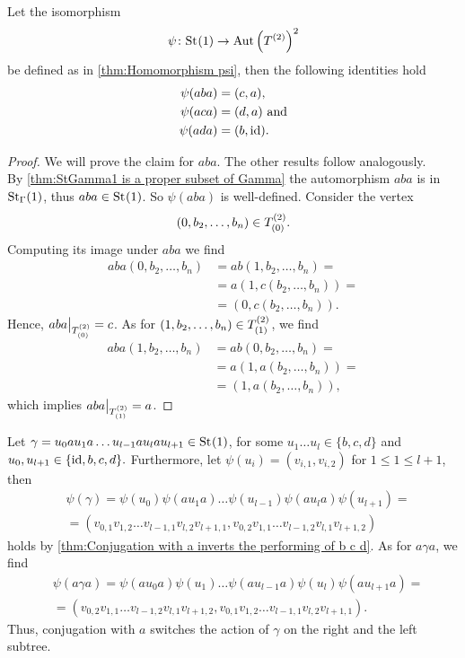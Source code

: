 \begin{thm}\label{thm:Conjugation with a inverts the performing of b c d}
Let the isomorphism
\begin{equation*}
\psi\colon\St{1}\to\AutT^2
\end{equation*}
be defined as in \cref{thm:Homomorphism psi}, then the following identities hold
\begin{align*}
\psi(aba)&=(c,a),\\
\psi(aca)&=(d,a) \text{ and}\\
\psi(ada)&=(b,\id).
\end{align*}
\end{thm}
\begin{proof}
We will prove the claim for $aba$. The other results follow analogously.\\
By \cref{thm:StGamma1 is a proper subset of Gamma} the automorphism $aba$ is in $\St[\Gamma]{1}$, thus $aba\in\St{1}$. So $\psi(aba)$ is well-defined. Consider the vertex
\begin{equation*}
(0,b_2,\ldots,b_n)\in\ST{(0)}.
\end{equation*}
Computing its image under $aba$ we find
\begin{align*}
aba(0,b_2,\ldots,b_n)&=ab(1,b_2,\ldots,b_n)=\\
&=a(1,c(b_2,\ldots,b_n))=\\
&=(0,c(b_2,\ldots,b_n)).
\end{align*}
Hence, $aba\big\vert_{\ST{(0)}}=c$. As for $(1,b_2,\ldots,b_n)\in\ST{(1)}$, we find
\begin{align*}
aba(1,b_2,\ldots,b_n)&=ab(0,b_2,\ldots,b_n)=\\
&=a(1,a(b_2,\ldots,b_n))=\\
&=(1,a(b_2,\ldots,b_n)),
\end{align*}
which implies $aba\big\vert_{\ST{(1)}}=a$.
\end{proof}
\begin{rem}
Let $\gamma=u_0au_1a\ldots u_{l-1}au_lau_{l+1}\in\St{1}$, for some $u_1\ldots u_{l}\in\lbrace b,c,d\rbrace$ and $u_0,u_{l+1}\in\lbrace \id,b,c,d\rbrace.$ Furthermore, let $\psi(u_i)=(v_{i,1},v_{i,2})$ for $1\leq 1\leq l+1$, then 
\begin{align*}
&\psi(\gamma)	=\psi(u_0)\psi(au_1a)\ldots\psi(u_{l-1})\psi(au_la)\psi(u_{l+1})=\\
			&=(v_{0,1}v_{1,2}\ldots v_{l-1,1}v_{l,2}v_{l+1,1},v_{0,2}v_{1,1}\ldots v_{l-1,2}v_{l,1}v_{l+1,2})
\end{align*}
holds by \cref{thm:Conjugation with a inverts the performing of b c d}. As for $a\gamma a$, we find
\begin{align*}
&\psi(a\gamma a)	=\psi(au_0a)\psi(u_1)\ldots\psi(au_{l-1}a)\psi(u_l)\psi(au_{l+1}a)=\\
			&=(v_{0,2}v_{1,1}\ldots v_{l-1,2}v_{l,1}v_{l+1,2},v_{0,1}v_{1,2}\ldots v_{l-1,1}v_{l,2}v_{l+1,1}).
\end{align*}
Thus, conjugation with $a$ switches the action of $\gamma$ on the right and the left subtree.
\end{rem}
